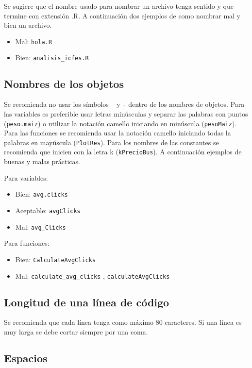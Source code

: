 \documentclass[10pt,]{krantz}
\begin{document}
Se sugiere que el nombre usado para nombrar un archivo tenga sentido y
que termine con extensión .R. A continuación dos ejemplos de como
nombrar mal y bien un archivo.

\begin{itemize}
    \item Mal: \verb|hola.R|
    \item Bien: \verb|analisis_icfes.R|
\end{itemize}

\subsection{Nombres de los objetos}

Se recomienda no usar los símbolos \texttt{\_} y \texttt{-} dentro de
los nombres de objetos. Para las variables es preferible usar letras
minúsculas y separar las palabras con puntos (\texttt{peso.maiz}) o
utilizar la notación camello iniciando en minúscula (\texttt{pesoMaiz}).
Para las funciones se recomienda usar la notación camello iniciando
todas la palabras en mayúscula (\texttt{PlotRes}). Para los nombres de
las constantes se recomienda que inicien con la letra k
(\texttt{kPrecioBus}). A continuación ejemplos de buenas y malas
prácticas.

Para variables:

\begin{itemize}
    \item Bien: \verb|avg.clicks|
    \item Aceptable: \verb|avgClicks|
    \item Mal: \verb|avg_Clicks|
\end{itemize}

Para funciones:

\begin{itemize}
    \item Bien: \verb|CalculateAvgClicks| 
    \item Mal: \verb|calculate_avg_clicks| , \verb|calculateAvgClicks|
\end{itemize}

\subsection{Longitud de una línea de código}

Se recomienda que cada línea tenga como máximo 80 caracteres. Si una
línea es muy larga se debe cortar siempre por una coma.

\subsection{Espacios}
\end{document}
